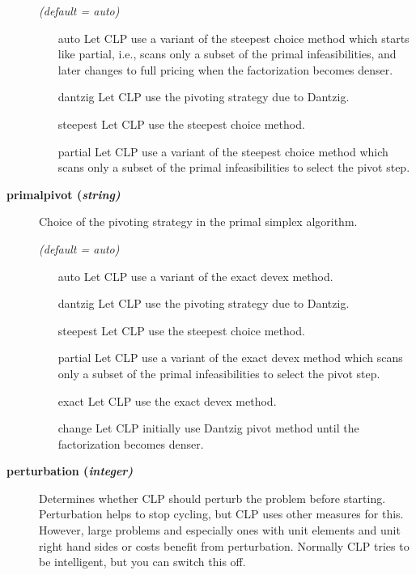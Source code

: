\begin{description}
\textsl{(default = auto)}
\begin{itemize}
\item[auto] 
Let CLP use a variant of the steepest choice method which starts like partial, i.e., scans only a subset of the primal infeasibilities,
and later changes to full pricing when the factorization becomes denser.
\item[dantzig] 
Let CLP use the pivoting strategy due to Dantzig.
\item[steepest] 
Let CLP use the steepest choice method.
\item[partial] 
Let CLP use a variant of the steepest choice method which scans only a subset of the primal infeasibilities to select the pivot step.
\end{itemize}

\item[\label{primalpivot}\hypertarget{primalpivot}
{\textbf{primalpivot (\slshape{string})}}]\hspace{1.0in}

Choice of the pivoting strategy in the primal simplex algorithm.

\textsl{(default = auto)}
\begin{itemize}
\item[auto] 
Let CLP use a variant of the exact devex method.
\item[dantzig] 
Let CLP use the pivoting strategy due to Dantzig.
\item[steepest] 
Let CLP use the steepest choice method.
\item[partial] 
Let CLP use a variant of the exact devex method which scans only a subset of the primal infeasibilities to select the pivot step.
\item[exact] 
Let CLP use the exact devex method.
\item[change] 
Let CLP initially use Dantzig pivot method until the factorization becomes denser.
\end{itemize}

\item[\label{perturbation}\hypertarget{perturbation}
{\textbf{perturbation (\slshape{integer})}}]\hspace{1.0in}

Determines whether CLP should perturb the problem before starting.
Perturbation helps to stop cycling, but CLP uses other measures for this.
However, large problems and especially ones with unit elements and unit right hand sides or costs benefit from perturbation.
Normally CLP tries to be intelligent, but you can switch this off.


\end{description}
